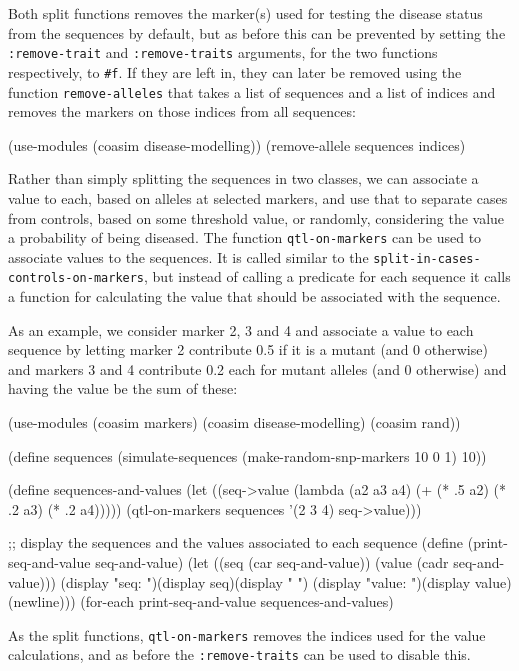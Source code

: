 \documentclass{manual}
\begin{document}
\begin{empfile}
Both split functions removes the marker(s) used for testing the
disease status from the sequences by default, but as before this can
be prevented by setting the \texttt{:remove-trait} and
\texttt{:remove-traits} arguments, for the two functions respectively,
to \texttt{\#f}.  If they are left in, they can later be removed using
the function \texttt{remove-alleles} that takes a list of sequences
and a list of indices and removes the markers on those indices from
all sequences:
\begin{code}
(use-modules (coasim disease-modelling))
(remove-allele sequences indices)
\end{code}

Rather than simply splitting the sequences in two classes, we can
associate a value to each, based on alleles at selected markers, and
use that to separate cases from controls, based on some threshold
value, or randomly, considering the value a probability of being
diseased.  The function \texttt{qtl-on-markers} can be used to
associate values to the sequences.  It is called similar to the
\texttt{split-in-cases-controls-on-markers}, but instead of calling a
predicate for each sequence it calls a function for calculating the
value that should be associated with the sequence.

As an example, we consider marker 2, 3 and 4 and associate a value to
each sequence by letting marker 2 contribute 0.5 if it is a mutant
(and 0 otherwise) and markers 3 and 4 contribute 0.2 each for mutant
alleles (and 0 otherwise) and having the value be the sum of these:
\begin{code}
(use-modules (coasim markers) (coasim disease-modelling) (coasim rand))

(define sequences
  (simulate-sequences (make-random-snp-markers 10 0 1) 10))

(define sequences-and-values
  (let ((seq->value (lambda (a2 a3 a4) (+ (* .5 a2) (* .2 a3) (* .2 a4)))))
    (qtl-on-markers sequences '(2 3 4) seq->value)))

;; display the sequences and the values associated to each sequence
(define (print-seq-and-value seq-and-value)
   (let ((seq   (car seq-and-value))
         (value (cadr seq-and-value)))
     (display "seq: ")(display seq)(display " ")
     (display "value: ")(display value)(newline)))
(for-each print-seq-and-value sequences-and-values)
\end{code}

As the split functions, \texttt{qtl-on-markers} removes the indices
used for the value calculations, and as before the
\texttt{:remove-traits} can be used to disable this.


\end{empfile}
\end{document}

